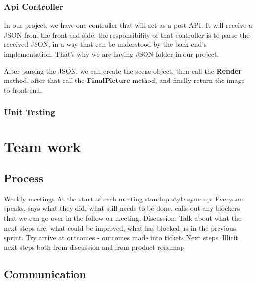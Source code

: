 \documentclass[a4paper]{article}
\begin{document}
	\subsubsection{Api Controller}
	In our project, we have one controller that will act as a post API. It will receive a JSON from the front-end side, the responsibility of that controller is to parse the received JSON, in a way that can be understood by the back-end's implementation. That's why we are having JSON folder in our project.\\
	\par After parsing the JSON, we can create the scene object, then call the  \textbf{Render} method, after that call the \textbf{FinalPicture} method, and finally return the image to front-end.
	\subsubsection{Unit Testing}
	\section{Team work} 
	
	
	\subsection{Process}
	Weekly meetings
	At the start of each meeting standup style sync up:
	Everyone speaks, says what they did, what still needs to be done, calls out any blockers that we can go over in the follow on meeting.
	Discussion: 
	Talk about what the next steps are, what could be improved, what has blocked us in the previous sprint. Try arrive at outcomes - outcomes made into tickets
	Next steps:
	Illicit next steps both from discussion and from product roadmap
	
	
	\subsection{Communication}
	
\end{document}
